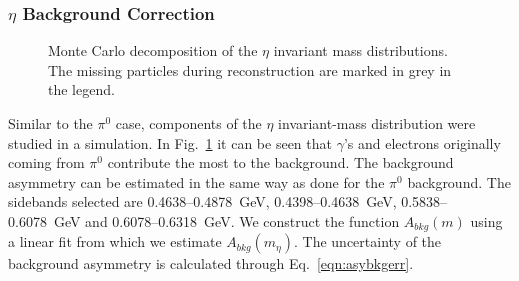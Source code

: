 \subsubsection{\texorpdfstring{$\eta$ Background Correction}{eta background correction}}
\begin{figure}[H]
  \centering     
  \caption[Monte Carlo decomposition of the invariant-mass distribution around the \(\eta\) mass]{Monte Carlo decomposition of the $\eta$ invariant mass distributions. The missing particles during reconstruction are marked in grey in the legend.}
  \label{fig:etacomponent}
\end{figure}
Similar to the $\pi^0$ case, components of the $\eta$ invariant-mass distribution were studied in a simulation. In Fig.~\ref{fig:etacomponent} it can be seen that $\gamma$'s and electrons originally coming from $\pi^0$ contribute the most to the background. The background asymmetry can be estimated in the same way as done for the $\pi^0$ background. The sidebands  selected are 0.4638--0.4878~GeV, 0.4398--0.4638~GeV, 0.5838--0.6078~GeV and 0.6078--0.6318~GeV. We construct the function $A_{bkg}(m)$ using a linear fit from which we estimate  $A_{bkg}(m_{\eta})$. The uncertainty of the background asymmetry is calculated through Eq.~\eqref{eqn:asybkgerr}.


